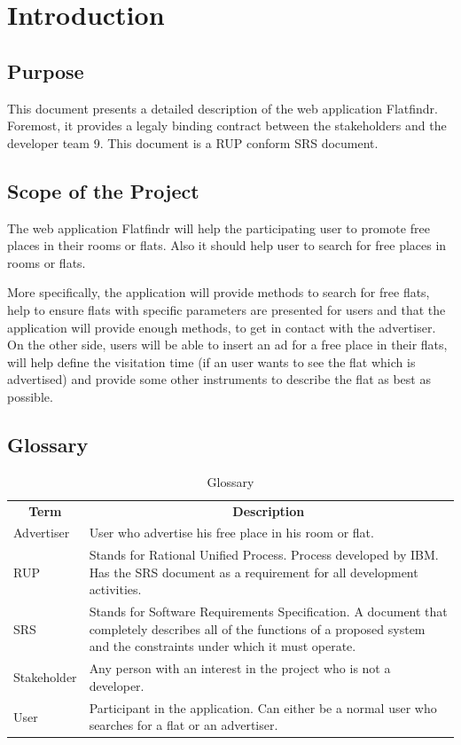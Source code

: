 \section{Introduction}

\subsection{Purpose}
This document presents a detailed description of the web application Flatfindr.
Foremost, it provides a legaly binding contract between the stakeholders and the
developer team 9. This document is a RUP conform SRS document.

\subsection{Scope of the Project}
The web application Flatfindr will help the participating user to promote free
places in their rooms or flats. Also it should help user to search for free
places in rooms or flats.

More specifically, the application will provide methods to search for free
flats, help to ensure flats with specific parameters are presented for users and
that the application will provide enough methods, to get in contact with the
advertiser. On the other side, users will be able to insert an ad for a free
place in their flats, will help define the visitation time (if an user wants to
see the flat which is advertised) and provide some other instruments to describe
the flat as best as possible.

\subsection{Glossary}

\begin{table}[H]
	\centering
	\begin{tabular}{p{3cm}p{9cm}}
	\multicolumn{1}{c}{\textbf{Term}} & \multicolumn{1}{c}{\textbf{Description}} \\
Advertiser & User who advertise his free place in his room or flat. \\
RUP & Stands for Rational Unified Process. Process developed by IBM. Has the SRS document as a requirement for all development activities. \\
SRS & Stands for Software Requirements Specification. A document that completely describes all of the functions of a proposed system and the constraints under which it must operate. \\
Stakeholder & Any person with an interest in the project who is not a developer. \\
User & Participant in the application. Can either be a normal user who searches for a flat or an advertiser. 
	\end{tabular}
	\caption{Glossary}
	\label{table-glossary}
\end{table}

